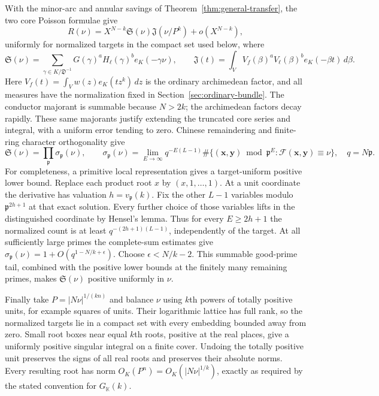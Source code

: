 \documentclass[11pt]{amsart}
\theoremstyle{definition}
\numberwithin{equation}{section}
\begin{document}
With the minor-arc and annular savings of Theorem~\ref{thm:general-transfer}, the two core Poisson formulae give
\[
 R(\nu)=X^{N-k}\mathfrak S(\nu)\mathfrak J(\nu/P^k)
            +o(X^{N-k}),
\]
uniformly for normalized targets in the compact set used below, where
\[
 \mathfrak S(\nu)=\sum_{\gamma\in K/\mathfrak D^{-1}}
      G(\gamma)^aH_\ell(\gamma)^b e_K(-\gamma\nu),
 \qquad
 \mathfrak J(t)=\int_V V_f(\beta)^aV_\ell(\beta)^b e_K(-\beta t)\,d\beta.
\]
Here $V_f(t)=\int_V w(z)e_K(tz^k)\,dz$ is the ordinary archimedean
factor, and all measures have the normalization fixed in
Section~\ref{sec:ordinary-bundle}.  The conductor majorant is summable
because $N>2k$; the archimedean factors decay rapidly.  These same majorants justify extending the truncated core
series and integral, with a uniform error tending to zero.
Chinese remaindering and finite-ring character orthogonality give
\[
 \mathfrak S(\nu)=\prod_{\mathfrak p}\sigma_{\mathfrak p}(\nu),\qquad
 \sigma_{\mathfrak p}(\nu)=\lim_{E\to\infty}
 q^{-E(L-1)}\#\{(\mathbf x,\mathbf y)\bmod\mathfrak p^E:
                       \mathcal F(\mathbf x,\mathbf y)\equiv\nu\},
 \quad q=N\mathfrak p.
\]
For completeness, a primitive local representation gives a target-uniform
positive lower bound.  Replace each product root $x$ by $(x,1,\ldots,1)$.
At a unit coordinate the derivative has valuation $h=v_{\mathfrak p}(k)$.
Fix the other $L-1$ variables modulo $\mathfrak p^{2h+1}$ at that exact solution.
Every further choice of those variables lifts in the distinguished coordinate
by Hensel's lemma.  Thus for every $E\ge2h+1$ the normalized count is at least
$q^{-(2h+1)(L-1)}$, independently of the target.
At all sufficiently large primes the complete-sum estimates give
$\sigma_{\mathfrak p}(\nu)=1+O(q^{1-N/k+\epsilon})$.
Choose $\epsilon<N/k-2$.  This summable good-prime tail, combined with the
positive lower bounds at the finitely many remaining primes, makes
$\mathfrak S(\nu)$ positive uniformly in $\nu$.

Finally take $P=|N\nu|^{1/(kn)}$ and balance $\nu$ using $k$th powers of
totally positive units, for example squares of units.  Their logarithmic
lattice has full rank, so the normalized targets lie in a compact set with
every embedding bounded away from zero.  Small root boxes near equal $k$th
roots, positive at the real places, give a uniformly positive singular
integral on a finite cover.  Undoing the totally positive unit preserves
the signs of all real roots and preserves their absolute norms.
Every resulting root has norm $O_K(P^n)=O_K(|N\nu|^{1/k})$, exactly as required
by the stated convention for $G_{\mathbb K}(k)$.
\end{document}

